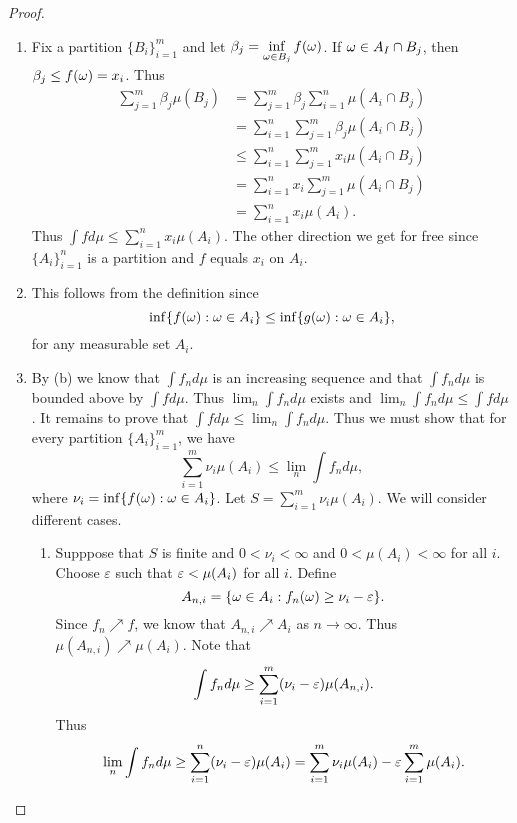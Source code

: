 \begin{proof}
    \begin{enumerate}
        \item Fix a partition $\{B_i\}_{i=1}^m$ and let $\beta_j = \inf\limits_{{\omega} \in B_j}f({\omega})$. If ${\omega} \in A_I \cap B_j$, then $\beta_j \le f({\omega}) = x_i$. Thus
        \begin{align*}
            \sum_{j=1}^m \beta_j \mu(B_j) &= \sum_{j=1}^m \beta_j \sum_{i=1}^n \mu(A_i \cap B_j)\\
            &= \sum_{i=1}^n \sum_{j=1}^m \beta_j \mu(A_i \cap B_j)\\
            &\le \sum_{i=1}^n \sum_{j=1}^m x_i \mu(A_i \cap B_j)\\
            &=\sum_{i=1}^n x_i \sum_{j=1}^m \mu(A_i \cap B_j)\\
            &= \sum_{i=1}^n x_i\mu(A_i).
        \end{align*}
        Thus $\int f d\mu \le \sum_{i=1}^n x_i \mu(A_i)$. The other direction we get for free since $\{A_i\}_{i=1}^n$ is a partition and $f$ equals $x_i$ on $A_i$.
        \item This follows from the definition since 
        \[\inf\{f({\omega}): {\omega} \in A_i \} \le \inf \{g({\omega}) : {\omega} \in A_i\}, \]
        for any measurable set $A_i$.
        \item By (b) we know that $\int f_n d\mu$ is an increasing sequence and that $\int f_n d\mu$ is bounded above by $\int f d\mu$. Thus $\lim_n \int f_n d\mu$ exists and $\lim_n \int f_nd\mu \le \int f d\mu$. It remains to prove that $\int f d\mu \le \lim_n \int f_n d\mu$. Thus we must show that for every partition $\{A_i\}_{i=1}^m$, we have 
        \[\sum_{i=1}^m \nu_i \mu(A_i) \le\lim_n\int f_nd\mu,\]
        where $\nu_i = \inf\{f({\omega}): {\omega} \in A_i\}$. Let $S = \sum_{i=1}^m \nu_i \mu(A_i)$. We will consider different cases.
        \begin{enumerate}
            \item Supppose that $S$ is finite and $0 < \nu_i < \infty$ and $0 < \mu(A_i)< \infty$ for all $i$. Choose $\varepsilon$ such that $\varepsilon< \mu(A_i)$ for all $i$. Define
            \[ A_{n,i} =\{{\omega} \in A_i : f_n({\omega}) \ge \nu_i - \varepsilon\}.\]
            Since $f_n \nearrow f$, we know that $A_{n,i} \nearrow A_i$ as $n \to \infty$. Thus $\mu(A_{n,i}) \nearrow \mu(A_i)$. Note that
            \[\int f_n d\mu \ge \sum_{i=1}^m (\nu_i-\varepsilon)\mu(A_{n,i}). \]
            Thus 
            \[\lim_n \int f_n d\mu \ge \sum_{i=1}^n (\nu_i-\varepsilon)\mu(A_i) = \sum_{i=1}^m \nu_i \mu(A_i) - \varepsilon\sum_{i=1}^m\mu(A_i). \]

\end{enumerate}
\end{enumerate}
\end{proof}
